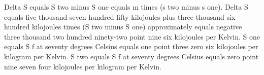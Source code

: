 Delta S equals S two minus S one equals m times (s two minus s one). Delta S equals five thousand seven hundred fifty kilojoules plus three thousand six hundred kilojoules times (S two minus S one) approximately equals negative three thousand two hundred ninety-two point nine six kilojoules per Kelvin. S one equals S f at seventy degrees Celsius equals one point three zero six kilojoules per kilogram per Kelvin. S two equals S f at seventy degrees Celsius equals zero point nine seven four kilojoules per kilogram per Kelvin.